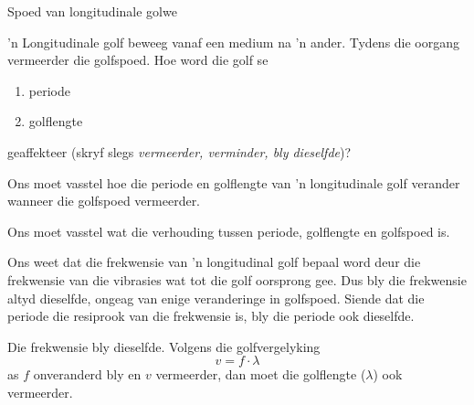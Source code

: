 \begin{wex}
{Spoed van longitudinale golwe}{ 'n Longitudinale golf beweeg vanaf een medium na 'n ander. Tydens die oorgang vermeerder die golfspoed. Hoe word die golf se  
\begin{enumerate}[noitemsep, label=\textbf{\arabic*}. ]
\item periode
\item golflengte
\end{enumerate}
geaffekteer (skryf slegs \emph{vermeerder, verminder, bly dieselfde})?
}{
Ons moet vasstel hoe die periode en golflengte van 'n longitudinale golf verander wanneer die golfspoed vermeerder.

Ons moet vasstel wat die verhouding tussen periode, golflengte en golfspoed is.

Ons weet dat die frekwensie van 'n longitudinal golf bepaal word deur die frekwensie van die vibrasies wat tot die golf oorsprong gee. Dus bly die frekwensie altyd dieselfde, ongeag van enige veranderinge in golfspoed. Siende dat die periode die resiprook van die frekwensie is, bly die periode ook dieselfde.

Die frekwensie bly dieselfde. Volgens die golfvergelyking
\begin{equation*}
v = f\cdot\lambda
\end{equation*}
as $f$ onveranderd bly en $v$ vermeerder, dan moet die golflengte ($\lambda$) ook vermeerder.
}
\end{wex}

    \noindent
  \label{m38782**end}
                   \label{m38783*cid8}


